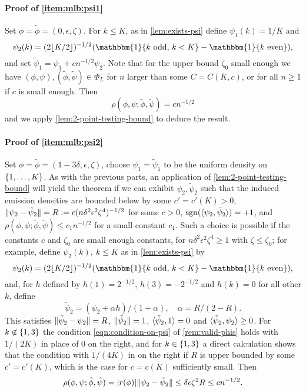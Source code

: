 \documentclass[journal]{IEEEtran}
\newcommand{\1}{\boldsymbol{1}}
\DeclareMathOperator{\sign}{sgn}
\DeclarePairedDelimiter{\braces}{\{}{\}}
\DeclarePairedDelimiter{\ip}{\langle}{\rangle}
\DeclarePairedDelimiter{\norm}{\lVert}{\rVert}
\DeclarePairedDelimiter{\abs}{\lvert}{\rvert}
\DeclarePairedDelimiter{\floor}{\lfloor}{\rfloor}
\newcommand{\II}{\mathbbm{1}}
\begin{document}
\paragraph{Proof of \cref{item:mlb:psi1}}
Set $\phi=\tilde{\phi}=(0,\epsilon,\zeta)$. For $k\leq K$, as in \cref{lem:exists-psi} define $\psi_1(k)=1/K$ and
\begin{equation*}
  \psi_2(k)=(2\floor{K/2})^{-1/2} (\II\braces{k\textnormal{ odd, } k<K}-\II\braces{k\textnormal{ even}}),
\end{equation*}
and set $\tilde{\psi}_1=\psi_1+cn^{-1/2}\psi_2$. Note that for the upper bound $\zeta_0$ small enough we have $(\phi,\psi),(\tilde{\phi},\tilde{\psi})\in\Phi_L$ for $n$ larger than some $C=C(K,c)$, or for all $n\geq 1$ if $c$ is small enough.
Then
\[ \rho(\phi,\psi;\tilde{\phi},\tilde{\psi})= cn^{-1/2}\] and we apply \cref{lem:2-point-testing-bound} to deduce the result.

\paragraph{Proof of \cref{item:mlb:psi2}}
Set $\phi=\tilde{\phi}=(1-3\delta,\epsilon,\zeta)$, choose $\psi_1=\tilde{\psi}_1$ to be the uniform density on $\braces{1,\dots,K}$. As with the previous parts, an application of \cref{lem:2-point-testing-bound} will yield the theorem if we can exhibit $\psi_2,\tilde{\psi}_2$ such that the induced emission densities are bounded below by some $c'=c'(K)>0$, $\norm{\psi_2-\tilde{\psi}_2}=R:=c(n\delta^2\epsilon^2\zeta^4)^{-1/2}$ for some $c>0$, $\sign(\ip{\psi_2,\tilde{\psi}_2})=+1$, and $\rho(\phi,\psi;\tilde{\phi},\tilde{\psi})\leq c_1n^{-1/2}$ for a small  constant $c_1$.
Such a choice is possible if the constants $c$ and $\zeta_0$ are small enough constants, for $n\delta^2\epsilon^2\zeta^4\geq 1$ with $\zeta\leq \zeta_0$; for example, define $\psi_2(k),~k\leq K$ as in \cref{lem:exists-psi} by \[\psi_2(k)=(2\floor{K/2})^{-1/2} (\II\braces{k\textnormal{ odd, } k<K}-\II\braces{k\textnormal{ even}}),\]
and, for $h$ defined by $h(1)=2^{-1/2}$, $h(3)=-2^{-1/2}$ and $h(k)=0$ for all other $k$, define
\[ \tilde{\psi}_2= (\psi_2+\alpha h)/(1+\alpha), \quad \alpha= R/(2-R).\]
This satisfies $\norm{\tilde{\psi}_2-\psi_2}=R$, $\norm{\tilde{\psi}_2}=1$, $\ip{\tilde{\psi}_2,1}=0$ and $\ip{\tilde{\psi}_2,\psi_2}\geq 0$. For $k\not \in\braces{1,3}$ the condition \eqref{eqn:condition-on-psi} of \cref{rem:valid-phis} holds with $1/(2K)$ in place of $0$ on the right, and for $k\in\braces{1,3}$ a direct calculation shows that the condition with $1/(4K)$ in on the right if $R$ is upper bounded by some $c'=c'(K)$, %
which is the case for $c=c(K)$ sufficiently small. Then
\[\rho(\phi,\psi;\tilde{\phi},\tilde{\psi})=\abs{r(\phi)}\norm{\psi_2-\tilde{\psi}_2}\leq \delta\epsilon\zeta^2R\leq cn^{-1/2}.\]
\end{document}
